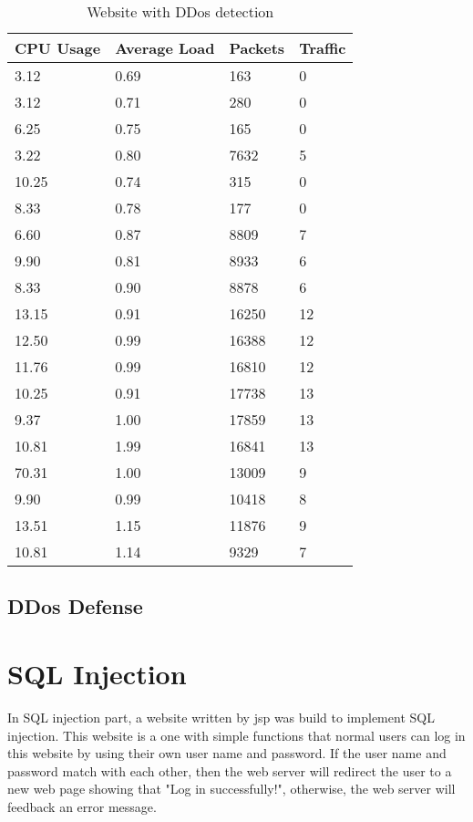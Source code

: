 \documentclass[12pt]{article}
\begin{document}
\begin{table}[htbp]
\centering
\caption{Website with DDos detection}
\begin{tabular}{ l l l   p{1cm}  }
\hline
  CPU Usage & Average Load & Packets & Traffic
 \\
  \hline
  3.12 & 0.69 & 163 & 0 \\
  3.12 & 0.71 & 280 & 0\\
  6.25 & 0.75 & 165 & 0\\
  3.22 & 0.80 & 7632 & 5\\
 10.25 & 0.74 & 315 & 0\\
  8.33 & 0.78 & 177 & 0\\
  6.60 & 0.87 & 8809 & 7\\
  9.90 & 0.81 & 8933 & 6\\
  8.33 & 0.90 & 8878 & 6\\
 13.15 & 0.91 & 16250 & 12\\
 12.50 & 0.99 & 16388 & 12\\
 11.76 & 0.99 & 16810 & 12\\
 10.25 & 0.91 & 17738 & 13\\
  9.37 & 1.00 & 17859 & 13\\
 10.81 & 1.99 & 16841 & 13\\
 70.31 & 1.00 & 13009 & 9\\
  9.90 & 0.99 & 10418 & 8\\
 13.51 & 1.15 & 11876 & 9\\
 10.81 & 1.14 & 9329 & 7\\
    \hline
\end{tabular}
\end{table}

\subsection{DDos Defense}


\newpage
\section{SQL Injection}

In SQL injection part, a website written by jsp was build to implement SQL injection. This website is a one with simple functions that normal users can log in this website by using their own user name and password. If the user name and password match with each other, then the web server will redirect the user to a new web page showing that "Log in successfully!", otherwise, the web server will feedback an error message.\\
\end{document}
